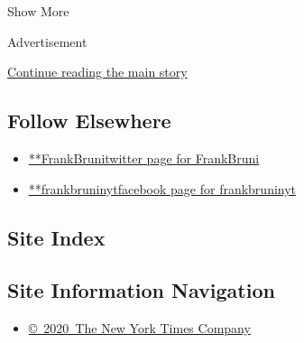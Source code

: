 Show More

Advertisement

\protect\hyperlink{after-mid2}{Continue reading the main story}

\hypertarget{follow-elsewhere}{%
\subsection{Follow Elsewhere}\label{follow-elsewhere}}

\begin{itemize}
\tightlist
\item
  \href{https://twitter.com/FrankBruni}{**FrankBrunitwitter page for
  FrankBruni}
\item
  \href{https://www.facebookcorewwwi.onion/frankbruninyt}{**frankbruninytfacebook
  page for frankbruninyt}
\end{itemize}

\hypertarget{site-index}{%
\subsection{Site Index}\label{site-index}}

\hypertarget{site-information-navigation}{%
\subsection{Site Information
Navigation}\label{site-information-navigation}}

\begin{itemize}
\tightlist
\item
  \href{https://help.nytimes3xbfgragh.onion/hc/en-us/articles/115014792127-Copyright-notice}{©~2020~The
  New York Times Company}
\end{itemize}

